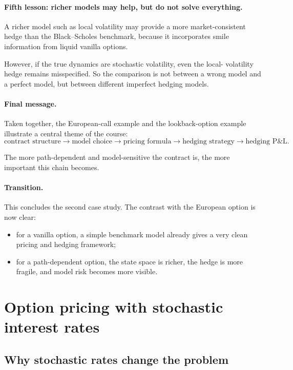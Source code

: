 \documentclass[11pt]{article}
\theoremstyle{plain}
\theoremstyle{definition}
\theoremstyle{remark}
\begin{document}
\paragraph{Fifth lesson: richer models may help, but do not solve everything.}
A richer model such as local volatility may provide a more
market-consistent hedge than the Black--Scholes benchmark, because it
incorporates smile information from liquid vanilla options.

However, if the true dynamics are stochastic volatility, even the local-
volatility hedge remains misspecified.
So the comparison is not between a wrong model and a perfect model, but
between different imperfect hedging models.

\paragraph{Final message.}
Taken together, the European-call example and the lookback-option
example illustrate a central theme of the course:
\[
\text{contract structure}
\longrightarrow
\text{model choice}
\longrightarrow
\text{pricing formula}
\longrightarrow
\text{hedging strategy}
\longrightarrow
\text{hedging P\&L}.
\]

The more path-dependent and model-sensitive the contract is, the more
important this chain becomes.

\paragraph{Transition.}
This concludes the second case study.
The contrast with the European option is now clear:
\begin{itemize}[leftmargin=1.4em]
    \item for a vanilla option, a simple benchmark model already gives a
    very clean pricing and hedging framework;
    \item for a path-dependent option, the state space is richer, the
    hedge is more fragile, and model risk becomes more visible.
\end{itemize}


\section{Option pricing with stochastic interest rates}

\subsection{Why stochastic rates change the problem}
\end{document}
